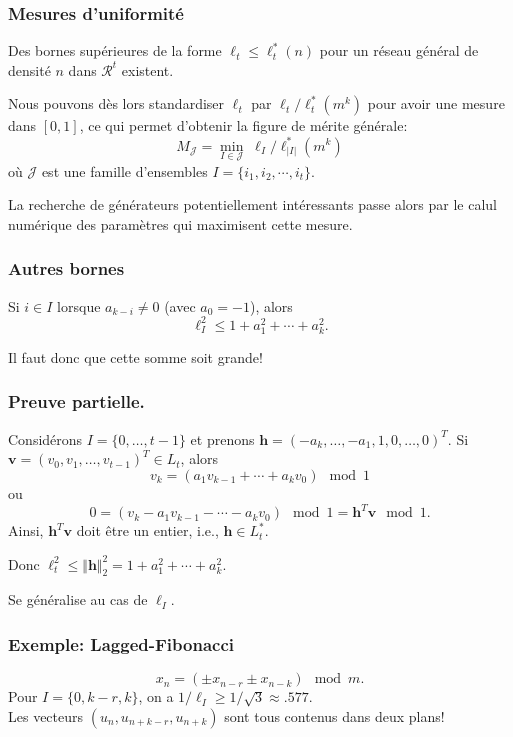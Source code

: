 \documentclass[t,usepdftitle=false]{beamer}
\def\bh{\boldsymbol{h}}
\def\bv{\boldsymbol{v}}
\def\cJ{\mathcal{J}}
\def\RR{\mathcal{R}}
\begin{document}
\begin{frame}
\frametitle{Mesures d'uniformité}

Des bornes supérieures de la forme 
$\ell_t \le {\ell^*_t(n)}$ pour un réseau général de 
densité $n$ dans $\RR^t$ existent.

\mbox{}

Nous pouvons dès lors standardiser $\ell_t$ par $\ell_t /
\ell_t^*(m^k)$ pour avoir une mesure dans $[0,1]$, ce qui permet
d'obtenir la figure de mérite générale:
\[
  {M_{\cJ}} = \min_{I\in \cJ}\; \ell_I / \ell_{|I|}^*(m^k)
\]
où ${\cJ}$ est une famille d'ensembles $I = \{i_1, i_2, \cdots, i_t\}$.

\mbox{}

La recherche de générateurs potentiellement intéressants passe alors
par le calul numérique des paramètres qui maximisent cette mesure.

\end{frame}

\begin{frame}
\frametitle{Autres bornes}

Si $i\in I$ lorsque $a_{k-i} \not= 0$ (avec $a_0=-1$), alors
\[
  \ell_I^2 \le 1 + a_1^2 + \cdots + a_k^2.    \label {eq:mrg-lbound1}
\]

\mbox{}

Il faut donc que cette somme soit grande!

\end{frame}

\begin{frame}
\frametitle{Preuve partielle.}

Considérons $I = \{0,\dots,t-1\}$ et prenons $\bh=(-a_k,\dots, -a_1, 1, 0,\dots,0)^T$.
Si $\bv = (v_0,v_1,\dots,v_{t-1})^T \in L_t$, alors 
$$v_k = (a_1 v_{k-1} + \cdots + a_k v_{0}) \mod 1$$
ou
$$0 = (v_k - a_1 v_{k-1} - \cdots - a_k v_{0}) \mod 1 = \bh^T \bv \mod 1. $$
Ainsi, $\bh^T \bv$ doit être un entier, i.e., $\bh \in L_t^*$.

Donc $\ell_t^2 \le \Vert\bh\Vert_2^2 = 1 + a_1^2 + \cdots + a_k^2$.

\mbox{}

Se généralise au cas de $\ell_I$.

\end{frame}

\begin{frame}
\frametitle{Exemple: Lagged-Fibonacci}

\[
  x_n = (\pm x_{n-r} \pm x_{n-k}) \mod m.
\]
Pour $I = \{0,k-r,k\}$, on a $1/\ell_I \ge 1/\sqrt{3} \approx .577.$ \\
Les vecteurs $(u_n, u_{n+k-r}, u_{n+k})$ sont tous contenus dans deux plans!

\end{frame}
\end{document}
